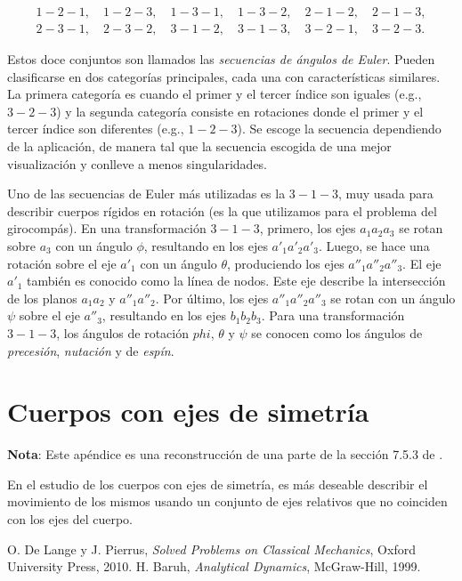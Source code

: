 \documentclass[a4paper,10pt]{article}
\numberwithin{equation}{section}
\begin{document}
\begin{align*}
 1-2-1,\quad 1-2-3,\quad 1-3-1,\quad 1-3-2,\quad 2-1-2,\quad 2-1-3, \\
 2-3-1,\quad 2-3-2,\quad 3-1-2,\quad 3-1-3,\quad 3-2-1,\quad 3-2-3.
\end{align*}

Estos doce conjuntos son llamados las \emph{secuencias de ángulos de Euler}. Pueden 
clasificarse en dos categorías principales, cada una con características similares. 
La primera categoría es cuando el primer y el tercer índice son iguales (e.g., $3-2-3$) 
y la segunda categoría consiste en rotaciones donde el primer y el tercer índice 
son diferentes (e.g., $1-2-3$). Se escoge la secuencia dependiendo de la aplicación, 
de manera tal que la secuencia escogida de una mejor visualización y conlleve a 
menos singularidades.
 
\vspace{.3cm}

Uno de las secuencias de Euler más utilizadas es la $3-1-3$, muy usada para describir 
cuerpos rígidos en rotación (es la que utilizamos para el problema del girocompás). En 
una transformación $3-1-3$, primero, los ejes $a_1a_2a_3$ se rotan sobre $a_3$ 
con un ángulo $\phi$, resultando en los ejes $a'_1a'_2a'_3$. Luego, se hace una rotación 
sobre el eje $a'_1$ con un ángulo $\theta$, produciendo los ejes $a''_1a''_2a''_3$. 
El eje $a'_1$ también es conocido como la línea de nodos. Este eje describe la 
intersección de los planos $a_1a_2$ y $a''_1a''_2$. Por último, los ejes $a''_1a''_2a''_3$ 
se rotan con un ángulo $\psi$ sobre el eje $a''_3$, resultando en los ejes $b_1b_2b_3$.
Para una transformación $3-1-3$, los ángulos de rotación $phi$, $\theta$ y $\psi$ se 
conocen como los ángulos de \emph{precesión}, \emph{nutación} y de \emph{espín}.

\section{Cuerpos con ejes de simetría}

\textbf{Nota}: Este apéndice es una reconstrucción de una parte de la sección 7.5.3 
de \cite{baruh}.

\vspace{.3cm}

En el estudio de los cuerpos con ejes de simetría, es más deseable describir el 
movimiento de los mismos usando un conjunto de ejes relativos que no coinciden con 
los ejes del cuerpo. 


\begin{thebibliography}{10}
 O. De Lange y J. Pierrus, \emph{Solved Problems on Classical Mechanics}, Oxford 
 University Press, 2010.
 H. Baruh, \emph{Analytical Dynamics}, McGraw-Hill, 1999.
\end{thebibliography}
\end{document}
